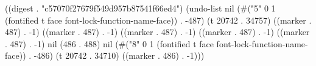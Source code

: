 
((digest . "c57070f27679f549d957b87541f66ed4") (undo-list nil (#("5" 0 1 (fontified t face font-lock-function-name-face)) . -487) (t 20742 . 34757) ((marker . 487) . -1) ((marker . 487) . -1) ((marker . 487) . -1) ((marker . 487) . -1) ((marker . 487) . -1) nil (486 . 488) nil (#("8" 0 1 (fontified t face font-lock-function-name-face)) . -486) (t 20742 . 34710) ((marker . 486) . -1)))
